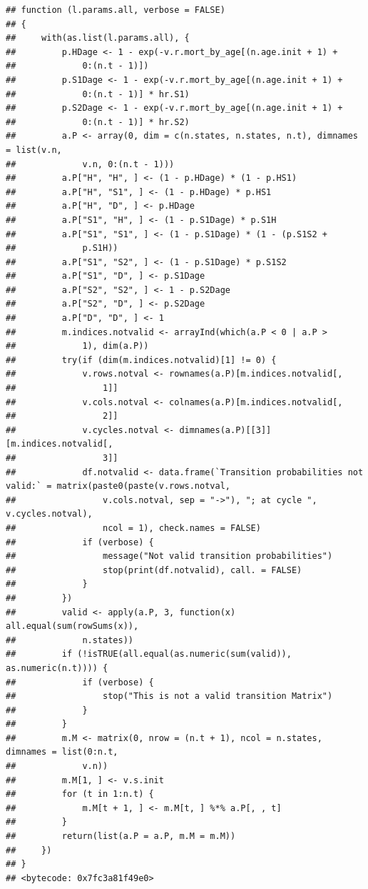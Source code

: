 \documentclass[]{article}
\begin{document}
\begin{verbatim}
## function (l.params.all, verbose = FALSE) 
## {
##     with(as.list(l.params.all), {
##         p.HDage <- 1 - exp(-v.r.mort_by_age[(n.age.init + 1) + 
##             0:(n.t - 1)])
##         p.S1Dage <- 1 - exp(-v.r.mort_by_age[(n.age.init + 1) + 
##             0:(n.t - 1)] * hr.S1)
##         p.S2Dage <- 1 - exp(-v.r.mort_by_age[(n.age.init + 1) + 
##             0:(n.t - 1)] * hr.S2)
##         a.P <- array(0, dim = c(n.states, n.states, n.t), dimnames = list(v.n, 
##             v.n, 0:(n.t - 1)))
##         a.P["H", "H", ] <- (1 - p.HDage) * (1 - p.HS1)
##         a.P["H", "S1", ] <- (1 - p.HDage) * p.HS1
##         a.P["H", "D", ] <- p.HDage
##         a.P["S1", "H", ] <- (1 - p.S1Dage) * p.S1H
##         a.P["S1", "S1", ] <- (1 - p.S1Dage) * (1 - (p.S1S2 + 
##             p.S1H))
##         a.P["S1", "S2", ] <- (1 - p.S1Dage) * p.S1S2
##         a.P["S1", "D", ] <- p.S1Dage
##         a.P["S2", "S2", ] <- 1 - p.S2Dage
##         a.P["S2", "D", ] <- p.S2Dage
##         a.P["D", "D", ] <- 1
##         m.indices.notvalid <- arrayInd(which(a.P < 0 | a.P > 
##             1), dim(a.P))
##         try(if (dim(m.indices.notvalid)[1] != 0) {
##             v.rows.notval <- rownames(a.P)[m.indices.notvalid[, 
##                 1]]
##             v.cols.notval <- colnames(a.P)[m.indices.notvalid[, 
##                 2]]
##             v.cycles.notval <- dimnames(a.P)[[3]][m.indices.notvalid[, 
##                 3]]
##             df.notvalid <- data.frame(`Transition probabilities not valid:` = matrix(paste0(paste(v.rows.notval, 
##                 v.cols.notval, sep = "->"), "; at cycle ", v.cycles.notval), 
##                 ncol = 1), check.names = FALSE)
##             if (verbose) {
##                 message("Not valid transition probabilities")
##                 stop(print(df.notvalid), call. = FALSE)
##             }
##         })
##         valid <- apply(a.P, 3, function(x) all.equal(sum(rowSums(x)), 
##             n.states))
##         if (!isTRUE(all.equal(as.numeric(sum(valid)), as.numeric(n.t)))) {
##             if (verbose) {
##                 stop("This is not a valid transition Matrix")
##             }
##         }
##         m.M <- matrix(0, nrow = (n.t + 1), ncol = n.states, dimnames = list(0:n.t, 
##             v.n))
##         m.M[1, ] <- v.s.init
##         for (t in 1:n.t) {
##             m.M[t + 1, ] <- m.M[t, ] %*% a.P[, , t]
##         }
##         return(list(a.P = a.P, m.M = m.M))
##     })
## }
## <bytecode: 0x7fc3a81f49e0>
\end{verbatim}
\end{document}
